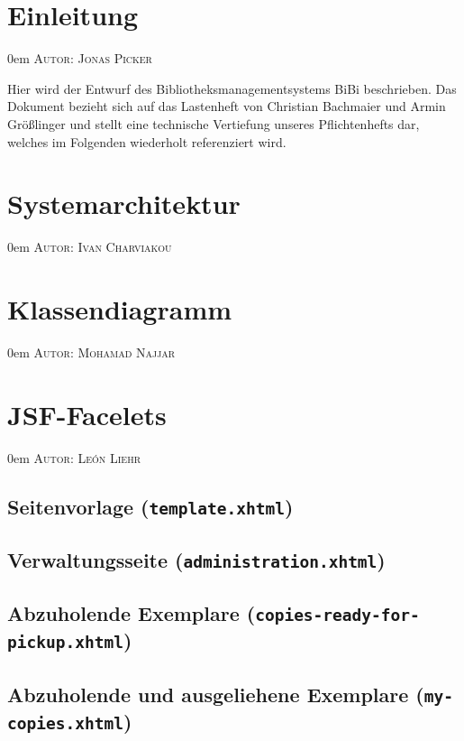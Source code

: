 \documentclass{article}
\makeatletter
\newcommand{\sectionauthor}[1]{
	{\parindent 0em \large \scshape Autor: #1 \par \nobreak \vspace*{1em}}
	\@afterheading
}
\makeatother
\begin{document}
\section{Einleitung}
\sectionauthor{Jonas Picker}
Hier wird der Entwurf des Bibliotheksmanagementsystems BiBi beschrieben. Das Dokument bezieht sich auf das Lastenheft von Christian Bachmaier und Armin Größlinger und stellt eine technische Vertiefung unseres Pflichtenhefts dar, welches im Folgenden wiederholt referenziert wird.

\section{Systemarchitektur}
\sectionauthor{Ivan Charviakou}

\section{Klassendiagramm}
\sectionauthor{Mohamad Najjar}

\section{JSF-Facelets}
\sectionauthor{León Liehr}

\newcommand{\facelet}[2]{\subsection{#1 (\texttt{#2.xhtml})}}

\facelet{Seitenvorlage}{template}

\facelet{Verwaltungsseite}{administration}

\facelet{Abzuholende Exemplare}{copies-ready-for-pickup}

\facelet{Abzuholende und ausgeliehene Exemplare}{my-copies}
\end{document}

